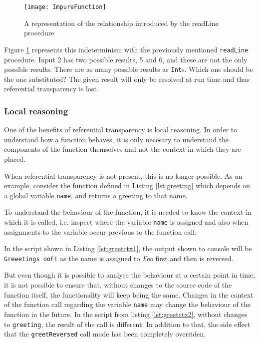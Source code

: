 \documentclass[../main.tex]{subfiles}
\begin{document}
\begin{figure}[ht]
  \centering \texttt{[image: ImpureFunction]}
  \caption{\label{fig:impurefunction} A representation of the relationship
    introduced by the readLine procedure}
\end{figure}

Figure \ref{fig:impurefunction} represents this indeterminism with the
previously mentioned \texttt{readLine} procedure. Input 2
has two possible results, 5 and 6, and these are not the only possible results.
There are as many possible results as \texttt{Int}s. Which one should be the one substituted? The
given result will only be resolved at run time and thus referential transparency
is lost.

\subsubsection{Local reasoning} One of the benefits of referential transparency
is local reasoning. In order to understand how a function behaves, it is only
necesary to understand the components of the function themselves and not the context
in which they are placed.

When referential transparency is not present, this is no longer possible. As an
example, consider the function defined in Listing \ref{lst:greeting} which
depends on a global variable \texttt{name}, and returns a greeting to that name.



To understand the behaviour of the function, it is needed to know the context in
which it is called, i.e. inspect where the variable \texttt{name} is assigned
and also when assignments to the variable occur previous to the function call.

In the script shown in Listing \ref{lst:greetctx1}, the output shown to console
will be \texttt{Greeetings ooF!} as the name is assigned to \textit{Foo} first
and then is reversed.



But even though it is possible to analyse the behaviour at a certain point in
time, it is not possible to ensure that, without changes to the source code of the
function itself, the functionality will keep being the same. Changes in the context
of the function call regarding the variable \texttt{name} may change the behaviour of
the function in the future. In the script from listing \ref{lst:greetctx2},
without changes to \texttt{greeting}, the result of the call is different. In
addition to that, the side effect that the \texttt{greetReversed} call made has
been completely overriden.
\end{document}

